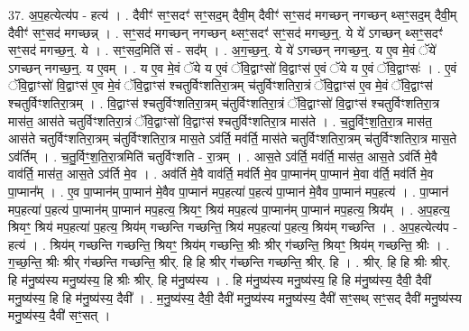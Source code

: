 \documentclass[17pt]{extarticle}
\begin{document}
37. अ॒प॒हत्येत्य॑प - हत्य॑ । . दैवीꣳ॑ सꣳ॒॒सदꣳ॑ सꣳ॒॒सद॒म् दैवी॒म् दैवीꣳ॑ सꣳ॒॒सद॑ मगच्छन् नगच्छन् थ्सꣳ॒॒सद॒म् दैवी॒म् दैवीꣳ॑ सꣳ॒॒सद॑ मगच्छन्न् । . सꣳ॒॒सद॑ मगच्छन् नगच्छन् थ्सꣳ॒॒सदꣳ॑ सꣳ॒॒सद॑ मगच्छ॒न्॒. ये ये॑ ऽगच्छन् थ्सꣳ॒॒सदꣳ॑ सꣳ॒॒सद॑ मगच्छ॒न्॒. ये । . सꣳ॒॒सद॒मिति॑ सं - सद᳚म् । . अ॒ग॒च्छ॒न्॒. ये ये॑ ऽगच्छन् नगच्छ॒न्॒. य ए॒व मे॒वं ॅये॑ ऽगच्छन् नगच्छ॒न्॒. य ए॒वम् । . य ए॒व मे॒वं ॅये य ए॒वं ॅवि॒द्वाꣳसो॑ वि॒द्वाꣳस॑ ए॒वं ॅये य ए॒वं ॅवि॒द्वाꣳसः॑ । . ए॒वं ॅवि॒द्वाꣳसो॑ वि॒द्वाꣳस॑ ए॒व मे॒वं ॅवि॒द्वाꣳस॑ श्चतुर्विꣳशतिरा॒त्रम् च॑तुर्विꣳशतिरा॒त्रं ॅवि॒द्वाꣳस॑ ए॒व मे॒वं ॅवि॒द्वाꣳस॑ श्चतुर्विꣳशतिरा॒त्रम् । . वि॒द्वाꣳस॑ श्चतुर्विꣳशतिरा॒त्रम् च॑तुर्विꣳशतिरा॒त्रं ॅवि॒द्वाꣳसो॑ वि॒द्वाꣳस॑ श्चतुर्विꣳशतिरा॒त्र मास॑त॒ आस॑ते चतुर्विꣳशतिरा॒त्रं ॅवि॒द्वाꣳसो॑ वि॒द्वाꣳस॑ श्चतुर्विꣳशतिरा॒त्र मास॑ते । . च॒तु॒र्विꣳ॒॒श॒ति॒रा॒त्र मास॑त॒ आस॑ते चतुर्विꣳशतिरा॒त्रम् च॑तुर्विꣳशतिरा॒त्र मास॒ते ऽव॑र्ति॒ मव॑र्ति॒ मास॑ते चतुर्विꣳशतिरा॒त्रम् च॑तुर्विꣳशतिरा॒त्र मास॒ते ऽव॑र्तिम् । . च॒तु॒र्विꣳ॒॒श॒ति॒रा॒त्रमिति॑ चतुर्विꣳशति - रा॒त्रम् । . आस॒ते ऽव॑र्ति॒ मव॑र्ति॒ मास॑त॒ आस॒ते ऽव॑र्ति मे॒वै वाव॑र्ति॒ मास॑त॒ आस॒ते ऽव॑र्ति मे॒व । . अव॑र्ति मे॒वै वाव॑र्ति॒ मव॑र्ति मे॒व पा॒प्मान॑म् पा॒प्मान॑ मे॒वा व॑र्ति॒ मव॑र्ति मे॒व पा॒प्मान᳚म् । . ए॒व पा॒प्मान॑म् पा॒प्मान॑ मे॒वैव पा॒प्मान॑ मप॒हत्या॑ प॒हत्य॑ पा॒प्मान॑ मे॒वैव पा॒प्मान॑ मप॒हत्य॑ । . पा॒प्मान॑ मप॒हत्या॑ प॒हत्य॑ पा॒प्मान॑म् पा॒प्मान॑ मप॒हत्य॒ श्रियꣳ॒॒ श्रिय॑ मप॒हत्य॑ पा॒प्मान॑म् पा॒प्मान॑ मप॒हत्य॒ श्रिय᳚म् । . अ॒प॒हत्य॒ श्रियꣳ॒॒ श्रिय॑ मप॒हत्या॑ प॒हत्य॒ श्रिय॑म् गच्छन्ति गच्छन्ति॒ श्रिय॑ मप॒हत्या॑ प॒हत्य॒ श्रिय॑म् गच्छन्ति । . अ॒प॒हत्येत्य॑प - हत्य॑ । . श्रिय॑म् गच्छन्ति गच्छन्ति॒ श्रियꣳ॒॒ श्रिय॑म् गच्छन्ति॒ श्रीः श्रीर् ग॑च्छन्ति॒ श्रियꣳ॒॒ श्रिय॑म् गच्छन्ति॒ श्रीः । . ग॒च्छ॒न्ति॒ श्रीः श्रीर् ग॑च्छन्ति गच्छन्ति॒ श्रीर्. हि हि श्रीर् ग॑च्छन्ति गच्छन्ति॒ श्रीर्. हि । . श्रीर्. हि हि श्रीः श्रीर्. हि म॑नु॒ष्य॑स्य मनु॒ष्य॑स्य॒ हि श्रीः श्रीर्. हि म॑नु॒ष्य॑स्य । . हि म॑नु॒ष्य॑स्य मनु॒ष्य॑स्य॒ हि हि म॑नु॒ष्य॑स्य॒ दैवी॒ दैवी॑ मनु॒ष्य॑स्य॒ हि हि म॑नु॒ष्य॑स्य॒ दैवी᳚ । . म॒नु॒ष्य॑स्य॒ दैवी॒ दैवी॑ मनु॒ष्य॑स्य मनु॒ष्य॑स्य॒ दैवी॑ सꣳ॒॒सथ् सꣳ॒॒सद् दैवी॑ मनु॒ष्य॑स्य मनु॒ष्य॑स्य॒ दैवी॑ सꣳ॒॒सत् । \newline
\pagebreak
{}
\end{document}
